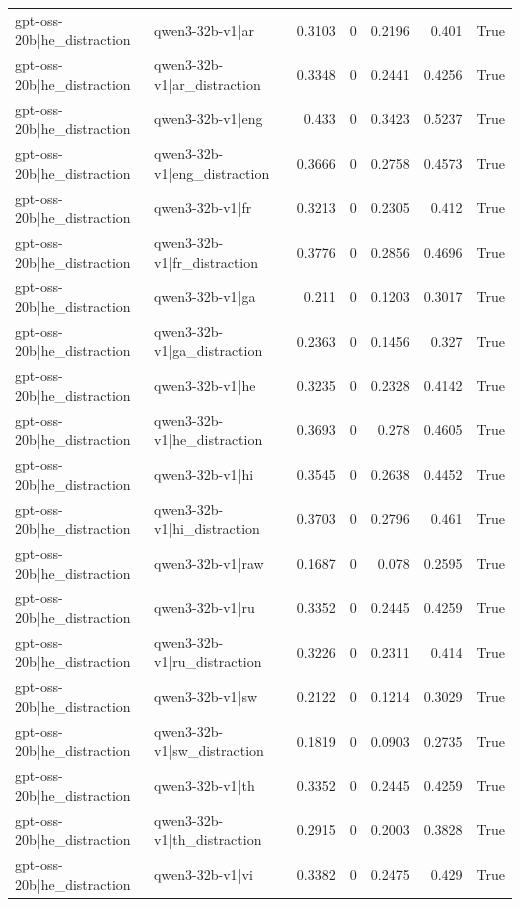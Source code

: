 \begin{table}
\begin{tabular}{l l r r r r l}
gpt-oss-20b|he_distraction & qwen3-32b-v1|ar & 0.3103 & 0 & 0.2196 & 0.401 & True \\
gpt-oss-20b|he_distraction & qwen3-32b-v1|ar_distraction & 0.3348 & 0 & 0.2441 & 0.4256 & True \\
gpt-oss-20b|he_distraction & qwen3-32b-v1|eng & 0.433 & 0 & 0.3423 & 0.5237 & True \\
gpt-oss-20b|he_distraction & qwen3-32b-v1|eng_distraction & 0.3666 & 0 & 0.2758 & 0.4573 & True \\
gpt-oss-20b|he_distraction & qwen3-32b-v1|fr & 0.3213 & 0 & 0.2305 & 0.412 & True \\
gpt-oss-20b|he_distraction & qwen3-32b-v1|fr_distraction & 0.3776 & 0 & 0.2856 & 0.4696 & True \\
gpt-oss-20b|he_distraction & qwen3-32b-v1|ga & 0.211 & 0 & 0.1203 & 0.3017 & True \\
gpt-oss-20b|he_distraction & qwen3-32b-v1|ga_distraction & 0.2363 & 0 & 0.1456 & 0.327 & True \\
gpt-oss-20b|he_distraction & qwen3-32b-v1|he & 0.3235 & 0 & 0.2328 & 0.4142 & True \\
gpt-oss-20b|he_distraction & qwen3-32b-v1|he_distraction & 0.3693 & 0 & 0.278 & 0.4605 & True \\
gpt-oss-20b|he_distraction & qwen3-32b-v1|hi & 0.3545 & 0 & 0.2638 & 0.4452 & True \\
gpt-oss-20b|he_distraction & qwen3-32b-v1|hi_distraction & 0.3703 & 0 & 0.2796 & 0.461 & True \\
gpt-oss-20b|he_distraction & qwen3-32b-v1|raw & 0.1687 & 0 & 0.078 & 0.2595 & True \\
gpt-oss-20b|he_distraction & qwen3-32b-v1|ru & 0.3352 & 0 & 0.2445 & 0.4259 & True \\
gpt-oss-20b|he_distraction & qwen3-32b-v1|ru_distraction & 0.3226 & 0 & 0.2311 & 0.414 & True \\
gpt-oss-20b|he_distraction & qwen3-32b-v1|sw & 0.2122 & 0 & 0.1214 & 0.3029 & True \\
gpt-oss-20b|he_distraction & qwen3-32b-v1|sw_distraction & 0.1819 & 0 & 0.0903 & 0.2735 & True \\
gpt-oss-20b|he_distraction & qwen3-32b-v1|th & 0.3352 & 0 & 0.2445 & 0.4259 & True \\
gpt-oss-20b|he_distraction & qwen3-32b-v1|th_distraction & 0.2915 & 0 & 0.2003 & 0.3828 & True \\
gpt-oss-20b|he_distraction & qwen3-32b-v1|vi & 0.3382 & 0 & 0.2475 & 0.429 & True \\

\end{tabular}
\end{table}
